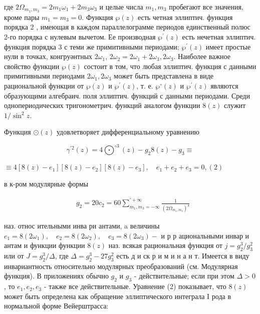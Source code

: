 \documentclass[10pt]{article}
\begin{document}
где $2 \Omega_{m_{1}, m_{3}}=2 m_{1} \omega_{1}+2 m_{3} \omega_{3}$ и целые числа $m_{1}, m_{3}$ пробегают все значения, кроме пары $m_{1}=m_{3}=0$. Функция $\wp(z)$ есть четная эллиптич. функция порядка 2 , имеющая в каждом параллелограмме периодов единственный полюс 2-го порядка с нулевым вычетом. Ее производная $\wp^{\prime}(z)$ есть нечетная эллиптич. функция порядка 3 с теми же примитивными периодами; $\wp^{\prime}(z)$ имеет простые нули в точках, конгруәнтных $2 \omega_{1}$, $2 \omega_{2}=2 \omega_{1}+2 \omega_{3}, 2 \omega_{3}$. Наиболее важное свойство функции $\wp(z)$ состоит в том, что любая эллиптич. функция с данными примитивными периодами $2 \omega_{1}, 2 \omega_{3}$ может быть представлена в виде рациональной функции от $\wp(z)$ и $\wp^{\prime}(z)$, т. е. $\wp^{\circ}(z)$ и $\wp^{\prime}(z)$ являются образующими алгебраич. поля эллиптич. функций с данными периодами. Среди однопериодических тригонометрич. функций аналогом функции $8(z)$ служит $1 / \sin ^{2} z$.



Функция $\odot(z)$ удовлетворяет дифференциальному уравнению



\[

\gamma^{\prime 2}(z)=4 \bigodot^{\circ 3}(z)-g_{2} 8(z)-g_{3} \equiv

\]



$\equiv 4\left[8(z)-e_{1}\right]\left[8(z)-e_{2}\right]\left[8(z)-e_{3}\right], \quad e_{1}+e_{2}+e_{3}=0,(2)$



в к-ром модулярные формы



\[

\begin{aligned}

& g_{2}=20 c_{2}=60 \sum_{m_{1}, m_{3}=-\infty}^{\prime+\infty} \frac{1}{\left(2 \Omega_{m_{1}, m_{3}}\right)^{4}}

\end{aligned}

\]



наз. относ ительными инва ри антами, a величины $e_{1}=8\left(2 \omega_{1}\right), \quad e_{2}=8\left(2 \omega_{2}\right), \quad e_{3}=8\left(2 \omega_{3}\right)-$ и р р ациональными инвар и антам и функции функции $8(z)$ наз. всякая рациональная функция от $j=g_{2}^{3} / g_{3}^{2}$ или от $J=g_{2}^{3} / \Delta$, где $\Delta=g_{2}^{3}-27 g_{3}^{2}$ есть д и ск р и м и н а н т. Имеется в виду инвариантность относительно модулярных преобразований (см. Модулярная функция). В приложениях обычно $g_{2}$ и $g_{3}$ - действительные; если при этом $\Delta>0$, то $e_{1}, e_{2}, e_{3}$ - также все действительные. Уравнение (2) показывает, что $8(z)$ может быть определена как обращение эллиптического интеграла I рода в нормальной форме Вейерштрасса:
\end{document}
